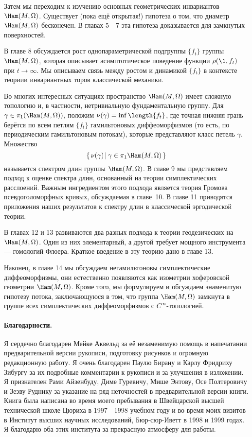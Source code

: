 Затем мы переходим к изучению основных геометрических инвариантов $\Ham(M,\Omega)$.
Существует (пока ещё открытая!) гипотеза о том, что диаметр $\Ham(M,\Omega)$ бесконечен.
В главах 5—7 эта гипотеза доказывается для замкнутых поверхностей.

В главе 8 обсуждается рост однопараметрической подгруппы $\{f_t\}$ группы $\Ham(M,\Omega)$, которая описывает асимптотическое поведение функции $\rho (\1, f_t)$ при $t \to \infty$.
Мы описываем связь между ростом и динамикой $\{f_t\}$ в контексте
теориии инвариантных торов классической механики.

Во многих интересных ситуациях пространство $\Ham(M,\Omega)$ имеет сложную топологию и, в частности, нетривиальную фундаментальную группу.
Для $\gamma\in\pi_1(\Ham(M,\Omega))$, положим $\nu(\gamma) \z= \inf \length \{f_t\}$, где
точная нижняя грань берётся по всем петлям $\{f_t\}$ гамильтоновых
диффеоморфизмов (то есть, по периодическим гамильтоновым потокам),
которые представляют класс петель $\gamma$.
Множество
\[\set{\nu(\gamma)}{\gamma\in\pi_{1}\Ham(M,\Omega)}\]
называется спектром длин группы $\Ham(M,\Omega)$.
В главе 9 мы представляем подход к оценке спектра длин, основанный на
теории симплектических расслоений. 
Важным ингредиентом этого подхода является теория Громова
псевдоголоморфных кривых, обсуждаемая в главе~10. 
В главе 11 приводятся приложения наших результатов к спектру длин в
классической эргодической теории.

В главах 12 и 13 развиваются два разных подхода к теории геодезических на $\Ham(M,\Omega)$.
Один из них элементарный, а другой требует мощного инструмента — гомологий Флоера.
Краткое введение в эту теорию дано в главе 13.

Наконец, в главе 14 мы обсуждаем негамильтоновы симплектические диффеоморфизмы, они естественно появляются как изометрии хоферовской геометрии $\Ham(M,\Omega)$.
Кроме того, мы формулируем и обсуждаем знаменитую гипотезу потока,
заключающуюся в том, что группа $\Ham(M,\Omega)$ замкнута в группе всех симплектических диффеоморфизмов с $C^\infty$-топологией. 


\paragraph*{Благодарности.}
Я сердечно благодарен Мейке Аквельд %
за её незаменимую помощь в напечатании предварительной версии рукописи,
подготовку рисунков и огромную редакционную работу.
Я очень благодарен Паулю Бирану и Карлу Фридриху Зибургу за их подробные комментарии к рукописи и за улучшения в изложении.
Я признателен 
Рами Айзенбуду,
Диме Гуревичу, 
Мише Энтову, 
Осе Полтеровичу
и Зеэву Руднику за указание на ряд неточностей в предварительной версии книги.
Книга была написана во время моего пребывания в Швейцарской высшей технической школе Цюриха в 1997—1998 учебном году и во время моих визитов в Институт высших научных исследований, Бюр-сюр-Иветт в 1998 и 1999 годах.
Я благодарю оба этих института за прекрасную атмосферу для работы. 
